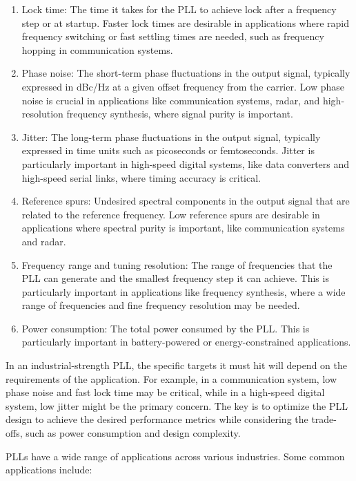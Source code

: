 \documentclass[
]{article}
\begin{document}
\begin{enumerate}
\def\labelenumi{\arabic{enumi}.}
\item
  Lock time: The time it takes for the PLL to achieve lock after a
  frequency step or at startup. Faster lock times are desirable in
  applications where rapid frequency switching or fast settling times
  are needed, such as frequency hopping in communication systems.
\item
  Phase noise: The short-term phase fluctuations in the output signal,
  typically expressed in dBc/Hz at a given offset frequency from the
  carrier. Low phase noise is crucial in applications like communication
  systems, radar, and high-resolution frequency synthesis, where signal
  purity is important.
\item
  Jitter: The long-term phase fluctuations in the output signal,
  typically expressed in time units such as picoseconds or femtoseconds.
  Jitter is particularly important in high-speed digital systems, like
  data converters and high-speed serial links, where timing accuracy is
  critical.
\item
  Reference spurs: Undesired spectral components in the output signal
  that are related to the reference frequency. Low reference spurs are
  desirable in applications where spectral purity is important, like
  communication systems and radar.
\item
  Frequency range and tuning resolution: The range of frequencies that
  the PLL can generate and the smallest frequency step it can achieve.
  This is particularly important in applications like frequency
  synthesis, where a wide range of frequencies and fine frequency
  resolution may be needed.
\item
  Power consumption: The total power consumed by the PLL. This is
  particularly important in battery-powered or energy-constrained
  applications.
\end{enumerate}

In an industrial-strength PLL, the specific targets it must hit will
depend on the requirements of the application. For example, in a
communication system, low phase noise and fast lock time may be
critical, while in a high-speed digital system, low jitter might be the
primary concern. The key is to optimize the PLL design to achieve the
desired performance metrics while considering the trade-offs, such as
power consumption and design complexity.

PLLs have a wide range of applications across various industries. Some
common applications include:
\end{document}
